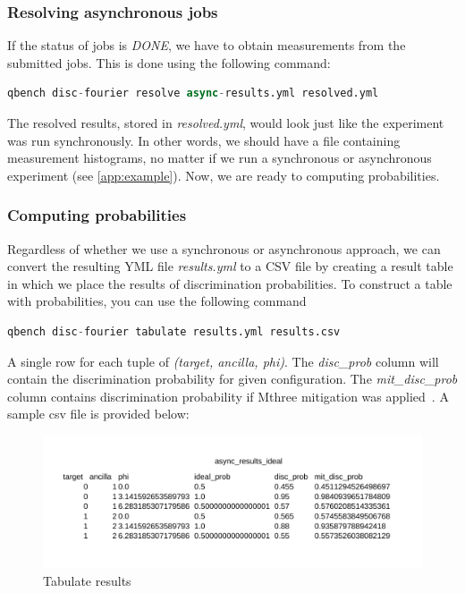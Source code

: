 \documentclass[preprint,12pt, a4paper, dvipsnames]{elsarticle}
\newcommand{\1}{{\rm 1\hspace{-0.9mm}l}}
\begin{document}
\subsubsection{Resolving asynchronous jobs}
If the status of jobs is \textit{DONE}, we have to obtain measurements from the submitted jobs. This is done using the following command:
\begin{lstlisting}[language=Python]
qbench disc-fourier resolve async-results.yml resolved.yml
\end{lstlisting}


The resolved results, stored in \textit{resolved.yml}, would look just like the experiment was run synchronously. In other words, we should have a file containing measurement histograms, no matter if we run a synchronous or asynchronous experiment (see \ref{app:example}). Now, we are ready to computing probabilities.


\subsubsection{Computing probabilities}
Regardless of whether we use a synchronous or asynchronous approach, we can convert the resulting YML file \textit{results.yml} to a CSV file by creating a result table in which we place the results of discrimination probabilities.
To construct a table with probabilities, you can use the following command
\begin{lstlisting}[language=Python]
qbench disc-fourier tabulate results.yml results.csv 
\end{lstlisting}
A single row for each tuple of \textit{(target, ancilla, phi)}. The \textit{disc\_prob} column will contain the discrimination probability for given configuration. The \textit{mit\_disc\_prob} column contains discrimination probability if Mthree mitigation was applied~\cite{mthree, mthreepublication}.
A sample csv file is provided below:
\begin{figure}[h!]
	\centering
	\includegraphics[scale=1]{results/async_result}
	\caption{Tabulate results}
	\label{fig:tabulateresults}
\end{figure}
\end{document}
